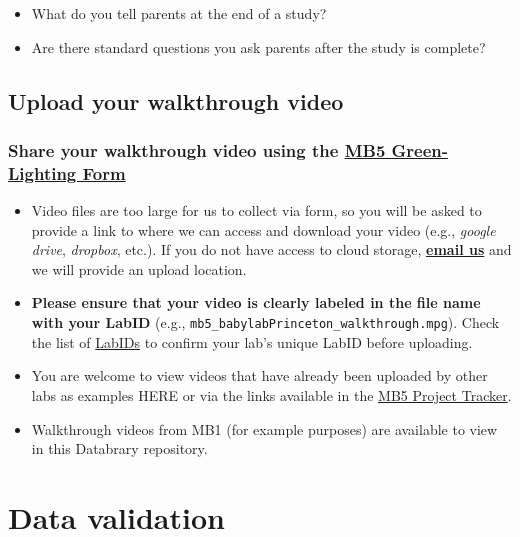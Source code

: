 \documentclass[
  letterpaper,
  DIV=11,
  numbers=noendperiod,
  oneside]{scrreprt}
\providecommand{\tightlist}{%
  \setlength{\itemsep}{0pt}\setlength{\parskip}{0pt}}
\begin{document}
\begin{itemize}
\tightlist
\item
  What do you tell parents at the end of a study?
\item
  Are there standard questions you ask parents after the study is
  complete?
\end{itemize}

\section{Upload your walkthrough
video}\label{upload-your-walkthrough-video}

\subsection{\texorpdfstring{Share your walkthrough video using the
\href{https://airtable.com/appRoqMKzcK3NsXt4/pagPm3MXnFExsz1Ti/form}{MB5
Green-Lighting
Form}}{Share your walkthrough video using the MB5 Green-Lighting Form}}\label{share-your-walkthrough-video-using-the}

\begin{itemize}
\tightlist
\item
  Video files are too large for us to collect via form, so you will be
  asked to provide a link to where we can access and download your video
  (e.g., \emph{google drive}, \emph{dropbox}, etc.). If you do not have
  access to cloud storage,
  \href{mailto:mb5@manybabies.org}{\textbf{email us}} and we will
  provide an upload location.
\item
  \textbf{Please ensure that your video is clearly labeled in the file
  name with your LabID} (e.g.,
  \texttt{mb5\_babylabPrinceton\_walkthrough.mpg}). Check the list of
  \href{https://manybabies.org/labids/}{LabIDs} to confirm your lab's
  unique LabID before uploading.
\item
  You are welcome to view videos that have already been uploaded by
  other labs as examples HERE or via the links available
  in the \href{https://manybabies.org/mb5-tracker}{MB5 Project Tracker}.
\item
  Walkthrough videos from MB1 (for example purposes) are available to
  view in this Databrary repository.
\end{itemize}

\chapter{Data validation}\label{sec-validation}
\end{document}
